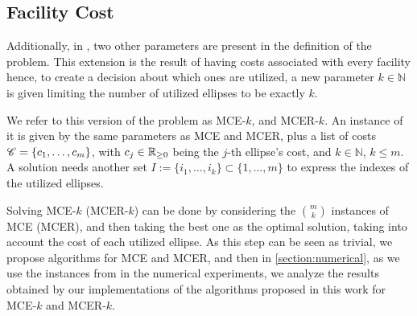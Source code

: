 \subsection{Facility Cost}

Additionally, in \cite{canbolat, andreta}, two other parameters are present in the definition of the problem. This extension is the result of having costs associated with every facility hence, to create a decision about which ones are utilized, a new parameter $k\in\mathbb{N}$ is given limiting the number of utilized ellipses to be exactly $k$.

We refer to this version of the problem as  MCE-$k$, and MCER-$k$. An instance of it is given by the same parameters as MCE and MCER, plus a list of costs $\mathscr{C}=\{c_1, \dots, c_m\}$, with $c_j\in\mathbb{R}_{\ge0}$ being the $j$-th ellipse's cost, and $k\in\mathbb{N}$, $k\le m$.
A solution needs another set $I:=\{i_1, \dots, i_k\}\subset\{1, \dots, m\}$ to express the indexes of the utilized ellipses.

Solving MCE-$k$ (MCER-$k$) can be done by considering the $\binom{m}{k}$ instances of MCE (MCER), and then taking the best one as the optimal solution, taking into account the cost of each utilized ellipse. 
As this step can be seen as trivial, we propose algorithms for MCE and MCER, and then in \autoref{section:numerical}, as we use the instances from \cite{canbolat, andreta} in the numerical experiments, we analyze the results obtained by our implementations of the algorithms proposed in this work for MCE-$k$ and MCER-$k$.
